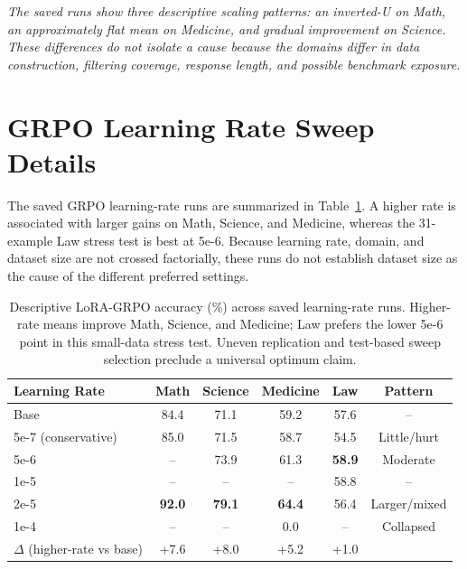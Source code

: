 \documentclass[11pt]{article}
\begin{document}
\begin{table}[h]
\vspace{0.5em}
\noindent\textit{The saved runs show three descriptive scaling patterns: an inverted-U on Math, an approximately flat mean on Medicine, and gradual improvement on Science. These differences do not isolate a cause because the domains differ in data construction, filtering coverage, response length, and possible benchmark exposure.}
\end{table}

\section{GRPO Learning Rate Sweep Details}
\label{sec:grpo_lr}

The saved GRPO learning-rate runs are summarized in Table~\ref{tab:full_grpo_lr}. A higher rate is associated with larger gains on Math, Science, and Medicine, whereas the 31-example Law stress test is best at 5e-6. Because learning rate, domain, and dataset size are not crossed factorially, these runs do not establish dataset size as the cause of the different preferred settings.

\begin{table}[h]
\centering
\small
\begin{tabular}{@{}lccccc@{}}
\toprule
\textbf{Learning Rate} & \textbf{Math} & \textbf{Science} & \textbf{Medicine} & \textbf{Law} & \textbf{Pattern} \\
\midrule
Base & 84.4 & 71.1 & 59.2 & 57.6 & -- \\
5e-7 (conservative) & 85.0 & 71.5 & 58.7 & 54.5 & Little/hurt \\
5e-6 & -- & 73.9 & 61.3 & \textbf{58.9} & Moderate \\
1e-5 & -- & -- & -- & 58.8 & -- \\
2e-5 & \textbf{92.0} & \textbf{79.1} & \textbf{64.4} & 56.4 & Larger/mixed \\
1e-4 & -- & -- & 0.0 & -- & Collapsed \\
\midrule
$\Delta$ (higher-rate vs base) & +7.6 & +8.0 & +5.2 & +1.0 & \\
\bottomrule
\end{tabular}
\caption{Descriptive LoRA-GRPO accuracy (\%) across saved learning-rate runs. Higher-rate means improve Math, Science, and Medicine; Law prefers the lower 5e-6 point in this small-data stress test. Uneven replication and test-based sweep selection preclude a universal optimum claim.}
\label{tab:full_grpo_lr}
\end{table}
\end{document}
